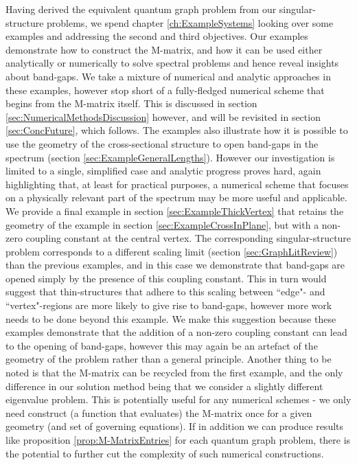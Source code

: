 Having derived the equivalent quantum graph problem from our singular-structure problems, we spend chapter \ref{ch:ExampleSystems} looking over some examples and addressing the second and third objectives.
Our examples demonstrate how to construct the M-matrix, and how it can be used either analytically or numerically to solve spectral problems and hence reveal insights about band-gaps.
We take a mixture of numerical and analytic approaches in these examples, however stop short of a fully-fledged numerical scheme that begins from the M-matrix itself.
This is discussed in section \ref{sec:NumericalMethodsDiscussion} however, and will be revisited in section \ref{sec:ConcFuture}, which follows.
The examples also illustrate how it is possible to use the geometry of the cross-sectional structure to open band-gaps in the spectrum (section \ref{sec:ExampleGeneralLengths}).
However our investigation is limited to a single, simplified case and analytic progress proves hard, again highlighting that, at least for practical purposes, a numerical scheme that focuses on a physically relevant part of the spectrum may be more useful and applicable.
We provide a final example in section \ref{sec:ExampleThickVertex} that retains the geometry of the example in section \ref{sec:ExampleCrossInPlane}, but with a non-zero coupling constant at the central vertex.
The corresponding singular-structure problem corresponds to a different scaling limit (section \ref{sec:GraphLitReview}) than the previous examples, and in this case we demonstrate that band-gaps are opened simply by the presence of this coupling constant.
This in turn would suggest that thin-structures that adhere to this scaling between ``edge"- and ``vertex"-regions are more likely to give rise to band-gaps, however more work needs to be done beyond this example.
We make this suggestion because these examples demonstrate that the addition of a non-zero coupling constant can lead to the opening of band-gaps, however this may again be an artefact of the geometry of the problem rather than a general principle.
Another thing to be noted is that the M-matrix can be recycled from the first example, and the only difference in our solution method being that we consider a slightly different eigenvalue problem.
This is potentially useful for any numerical schemes - we only need construct (a function that evaluates) the M-matrix once for a given geometry (and set of governing equations).
If in addition we can produce results like proposition \ref{prop:M-MatrixEntries} for each quantum graph problem, there is the potential to further cut the complexity of such numerical constructions. \newline

